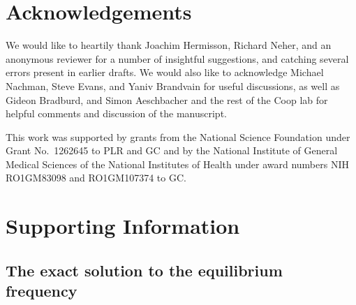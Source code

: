 \documentclass{article}
\newif\ifsubmissionversion
\newcommand{\revpoint}[2]{}
\begin{document}


\section*{Acknowledgements}
We would like to heartily thank Joachim Hermisson, Richard Neher, and an anonymous reviewer
for a number of insightful suggestions,
and catching several errors present in earlier drafts. \revpoint{3}{4}
We would also like to acknowledge Michael Nachman, Steve Evans, and Yaniv Brandvain for useful discussions, 
as well as Gideon Bradburd, and Simon Aeschbacher and the rest of the Coop lab
for helpful comments and discussion of the manuscript.
\ifsubmissionversion
\else
This work was supported by grants from the
National Science Foundation under Grant No.\ 1262645 to PLR and GC and by the
National Institute of General Medical Sciences of the National
Institutes of Health under award numbers NIH RO1GM83098 and
RO1GM107374 to GC.
\fi




\ifsubmissionversion
\clearpage
\renewcommand*\listfigurename{Figure Legends}
\listoffigures
\fi

\clearpage

\renewcommand{\thesfigure}{S\arabic{sfigure}}
\renewcommand{\thetable}{S\arabic{table}}
\ifsubmissionversion
  \renewcommand{\thepostsfigure}{S\arabic{postsfigure}}
  \renewcommand{\theposttable}{S\arabic{posttable}}
  \setcounter{posttable}{0}
\fi

\ifsubmissionversion
  \renewcommand*\listsfigurename{Supplementary Figure Legends}
  \listofsfigures
  \renewcommand*\listtablename{Supplementary Table Legends}
  \listoftables
  \pagebreak
\fi

\appendix
\section*{Supporting Information}

\setcounter{secnumdepth}{2}

\subsection*{The exact solution to the equilibrium frequency}
\label{apx:elliptic_integrals}
\end{document}
